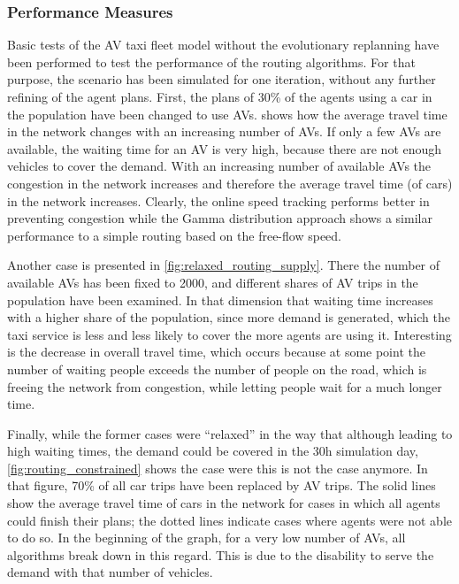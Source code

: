 \subsubsection{Performance Measures}
\label{sec:routingperf}

Basic tests of the AV taxi fleet model without the evolutionary replanning have been performed to test the
performance of the routing algorithms. For that purpose, the scenario has been
simulated for one iteration, without any further refining of the agent plans.
First, the plans of 30\% of the agents using a car in the population have been
changed to use AVs.  shows how
the average travel time in the network changes with an increasing number of AVs.
If only a few AVs are available, the waiting time for an AV is very high, because
there are not enough vehicles to cover the demand. With an increasing number of
available AVs the congestion in the network increases and therefore the average
travel time (of cars) in the network increases. Clearly, the online speed tracking performs
better in preventing congestion while the Gamma distribution approach shows a
similar performance to a simple routing based on the free-flow speed.

Another case is presented in \cref{fig:relaxed_routing_supply}. There the number
of available AVs has been fixed to 2000, and different shares of AV trips in the
population have been examined. In that dimension that waiting time increases with
a higher share of the population, since more demand is generated, which the taxi
service is less and less likely to cover the more agents are using it.
Interesting is the decrease in overall travel time, which occurs because at some
point the number of waiting people exceeds the number of people on the road, which
is freeing the network from congestion, while letting people wait for
a much longer time.

Finally, while the former cases were ``relaxed'' in the way that although leading
to high waiting times, the demand could be covered in the 30h simulation day, \cref{fig:routing_constrained}
shows the case were this is not the case anymore. In that figure, 70\% of all car
trips have been replaced by AV trips. The solid lines show the average travel time
of cars in the network for cases in which all agents could finish their plans; the
dotted lines indicate cases where agents were not able to do so. In the beginning
of the graph, for a very low number of AVs, all algorithms break down in this
regard. This is due to the disability to serve the demand with that number of
vehicles.

